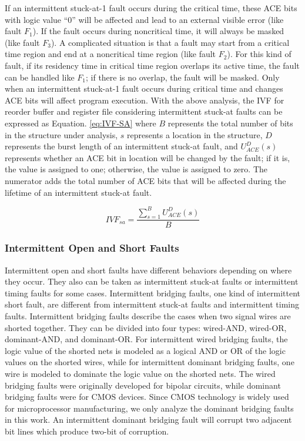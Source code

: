If an intermittent stuck-at-1 fault occurs during the critical time, these ACE bits with logic value “0” will be affected and lead to an external visible error (like fault $F_1$). If the fault occurs during noncritical time, it will always be masked (like fault $F_3$). A complicated situation is that a fault may start from a critical time region and end at a noncritical time region (like fault $F_2$). For this kind of fault, if its residency time in critical time region overlaps its active time, the fault can be handled like $F_1$; if there is no overlap, the fault will be masked. Only when an intermittent stuck-at-1 fault occurs during critical time and changes ACE bits will affect program execution. With the above analysis, the IVF for reorder buffer and register file considering intermittent stuck-at faults can be expressed as Equation. \ref{eq:IVF-SA} where $B$ represents the total number of bits in the structure under analysis, $s$ represents a location in the structure, $D$ represents the burst length of an intermittent stuck-at fault, and $U_{ACE}^D(s)$ represents whether an ACE bit in location will be changed by the fault; if it is, the value is assigned to one; otherwise, the value is assigned to zero. The numerator adds the total number of ACE bits that will be affected during the lifetime of an intermittent stuck-at fault.

\begin{equation} \label{eq:IVF-SA}
    IVF_{sa}=\frac{\sum_{s=1}^{B}U_{ACE}^{D}(s)}{B}
\end{equation}

\subsubsection{Intermittent Open and Short Faults}
Intermittent open and short faults have different behaviors depending on where they occur. They also can be taken as intermittent stuck-at faults or intermittent timing faults for some cases. Intermittent bridging faults, one kind of intermittent short fault, are different from intermittent stuck-at faults and intermittent timing faults. Intermittent bridging faults describe the cases when two signal wires are shorted together. They can be divided into four types: wired-AND, wired-OR, dominant-AND, and dominant-OR. For intermittent wired bridging faults, the logic value of the shorted nets is modeled as a logical AND or OR of the logic values on the shorted wires, while for intermittent dominant bridging faults, one wire is modeled to dominate the logic value on the shorted nets. The wired bridging faults were originally developed for bipolar circuits, while dominant bridging faults were for CMOS devices. Since CMOS technology is widely used for microprocessor manufacturing, we only analyze the dominant bridging faults in this work. An intermittent dominant bridging fault will corrupt two adjacent bit lines which produce two-bit of corruption.

